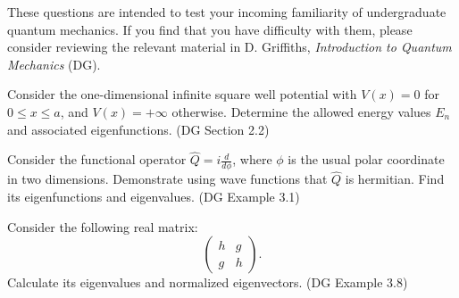 \documentclass[answers]{exam}
\begin{document}
These questions are intended to test your incoming familiarity of undergraduate quantum mechanics. If you find that you have difficulty with them, please consider reviewing the relevant material in D. Griffiths, \textit{Introduction to Quantum Mechanics} (DG).

\begin{questions}

  \begin{question}
    Consider the one-dimensional infinite square well potential with $V(x) = 0$ for $0 \le x \le a$, and $V(x) = +\infty$ otherwise. Determine the allowed energy values $E_n$ and associated eigenfunctions. (DG Section 2.2)
  \end{question}

  \pagebreak

  \begin{question}
    Consider the functional operator $\hat{Q} = i \frac{d}{d\phi}$, where $\phi$ is the usual polar coordinate in two dimensions. Demonstrate using wave functions that $\hat{Q}$ is hermitian. Find its eigenfunctions and eigenvalues. (DG Example 3.1)
  \end{question}

  \pagebreak

  \begin{question}
    Consider the following real matrix: \[ \left( \begin{array}{cc} h & g \\ g & h \end{array} \right). \]
    Calculate its eigenvalues and normalized eigenvectors. (DG Example 3.8)
  \end{question}

\end{questions}
\end{document}
